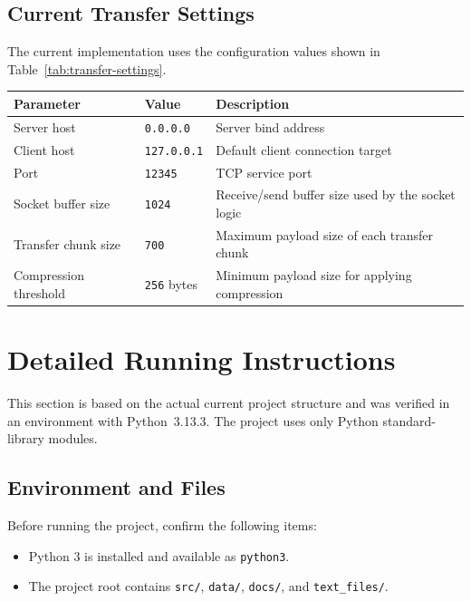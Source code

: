 \documentclass[conference]{IEEEtran}
\begin{document}
\subsection{Current Transfer Settings}
The current implementation uses the configuration values shown in Table~\ref{tab:transfer-settings}.

\begin{center}
	\footnotesize
	\label{tab:transfer-settings}
	\renewcommand{\arraystretch}{1.15}
	\begin{tabularx}{\columnwidth}{
			>{\raggedright\arraybackslash}p{}
			>{\raggedright\arraybackslash}p{}
			>{\raggedright\arraybackslash}p{}
		}
		\toprule
		\textbf{Parameter} & \textbf{Value} & \textbf{Description} \\
		\midrule
		Server host & \texttt{0.0.0.0} & Server bind address \\
		Client host & \texttt{127.0.0.1} & Default client connection target \\
		Port & \texttt{12345} & TCP service port \\
		Socket buffer size & \texttt{1024} & Receive/send buffer size used by the socket logic \\
		Transfer chunk size & \texttt{700} & Maximum payload size of each transfer chunk \\
		Compression threshold & \texttt{256} bytes & Minimum payload size for applying compression \\
		\bottomrule
	\end{tabularx}
\end{center}

\vspace{0.65\baselineskip}
\section{Detailed Running Instructions}
This section is based on the actual current project structure and was verified in an environment with Python~3.13.3. The project uses only Python standard-library modules.

\subsection{Environment and Files}
Before running the project, confirm the following items:
\begin{itemize}
\item Python 3 is installed and available as \texttt{python3}.
\item The project root contains \texttt{src/}, \texttt{data/}, \texttt{docs/}, and \texttt{text\_files/}.
\end{itemize}
\end{document}
